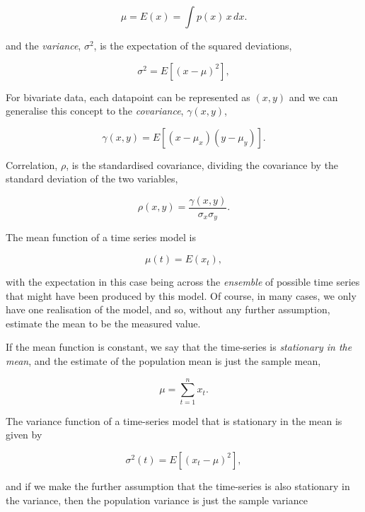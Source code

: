 \documentclass[10pt, a4paper]{article}
\begin{document}
\begin{equation}
\mu = E(x) = \int p(x) \, x \, dx.
\end{equation}

\noindent
and the \emph{variance}, $\sigma^2$, is the expectation of the squared
deviations,

\begin{equation}
\sigma^2 = E[(x - \mu)^2],
\end{equation}

For bivariate data, each datapoint can be represented as $(x, y)$ and
we can generalise this concept to the \emph{covariance},
$\gamma(x, y)$,

\begin{equation}
\gamma(x, y) = E[(x - \mu_x)(y - \mu_y)].
\end{equation}

\noindent
Correlation, $\rho$, is the standardised covariance, dividing the
covariance by the standard deviation of the two variables,

\begin{equation}
\rho(x, y) = \frac{\gamma(x, y)}{\sigma_x \sigma_y}.
\end{equation}

\noindent
The mean function of a time series model is

\begin{equation}
\mu(t) = E(x_t),
\end{equation}

\noindent
with the expectation in this case being across the \emph{ensemble} of
possible time series that might have been produced by this model. Of
course, in many cases, we only have one realisation of the model, and
so, without any further assumption, estimate the mean to be the
measured value.

If the mean function is constant, we say that the time-series is
\emph{stationary in the mean}, and the estimate of the population mean
is just the sample mean,

\begin{equation}
\mu = \sum^n_{t=1} x_t.
\end{equation}

\noindent
The variance function of a time-series model that is stationary in the
mean is given by

\begin{equation}
\sigma^2(t) = E[(x_t - \mu)^2],
\end{equation}

\noindent
and if we make the further assumption that the time-series is also
stationary in the variance, then the population variance is just the
sample variance
\end{document}

